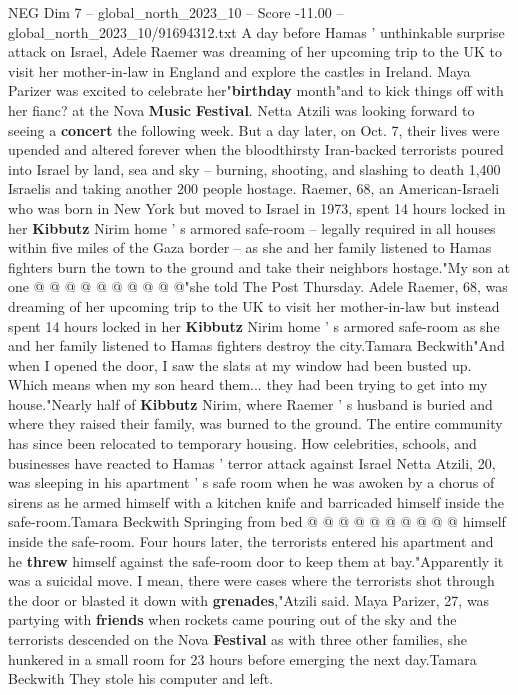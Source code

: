 \begin{textsample}{NEG Dim 7 – global\_north\_2023\_10 – Score -11.00 – global\_north\_2023\_10/91694312.txt}  \label{ex:f7_neg_029}
A day before Hamas ' unthinkable surprise attack on Israel, Adele Raemer was dreaming of her upcoming trip to the UK to visit her mother-in-law in England and explore the castles in Ireland.
Maya Parizer was excited to celebrate her"\textbf{birthday} month"and to kick things off with her fianc? at the Nova \textbf{Music} \textbf{Festival}.
Netta Atzili was looking forward to seeing a \textbf{concert} the following week.
But a day later, on Oct. 7, their lives were upended and altered forever when the bloodthirsty Iran-backed terrorists poured into Israel by land, sea and sky -- burning, shooting, and slashing to death 1,400 Israelis and taking another 200 people hostage.
Raemer, 68, an American-Israeli who was born in New York but moved to Israel in 1973, spent 14 hours locked in her \textbf{Kibbutz} Nirim home ' s armored safe-room -- legally required in all houses within five miles of the Gaza border -- as she and her family listened to Hamas fighters burn the town to the ground and take their neighbors hostage."My son at one @ @ @ @ @ @ @ @ @ @"she told The Post Thursday.
Adele Raemer, 68, was dreaming of her upcoming trip to the UK to visit her mother-in-law but instead spent 14 hours locked in her \textbf{Kibbutz} Nirim home ' s armored safe-room as she and her family listened to Hamas fighters destroy the city.Tamara Beckwith"And when I opened the door, I saw the slats at my window had been busted up.
Which means when my son heard them... they had been trying to get into my house."Nearly half of \textbf{Kibbutz} Nirim, where Raemer ' s husband is buried and where they raised their family, was burned to the ground.
The entire community has since been relocated to temporary housing.
How celebrities, schools, and businesses have reacted to Hamas ' terror attack against Israel Netta Atzili, 20, was sleeping in his apartment ' s safe room when he was awoken by a chorus of sirens as he armed himself with a kitchen knife and barricaded himself inside the safe-room.Tamara Beckwith Springing from bed @ @ @ @ @ @ @ @ @ @ himself inside the safe-room.
Four hours later, the terrorists entered his apartment and he \textbf{threw} himself against the safe-room door to keep them at bay."Apparently it was a suicidal move.
I mean, there were cases where the terrorists shot through the door or blasted it down with \textbf{grenades},"Atzili said.
Maya Parizer, 27, was partying with \textbf{friends} when rockets came pouring out of the sky and the terrorists descended on the Nova \textbf{Festival} as with three other families, she hunkered in a small room for 23 hours before emerging the next day.Tamara Beckwith They stole his computer and left.

\end{textsample}

